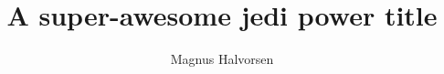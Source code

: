 \documentclass[]{report}
\title{A super-awesome jedi power title}
\author{Magnus Halvorsen}
\begin{document}
\maketitle

\begin{abstract}
\end{abstract}






\end{document}
